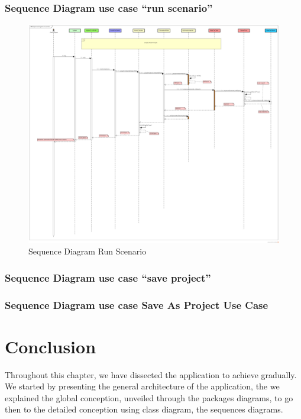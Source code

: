 	\subsubsection{Sequence Diagram use case ``run scenario''}
	\begin{figure}[h]
		\centering
		\includegraphics[width=1\textwidth]{SequenceDiagramRunScenario.png}
		\caption{Sequence Diagram Run Scenario}
	\end{figure}
	\clearpage
    \newpage 
	\subsubsection{Sequence Diagram use case ``save project''}	
	
	
    \pagebreak

	\clearpage
	\newpage
	\subsubsection{Sequence Diagram use case Save As Project Use Case}


    \pagebreak
	\clearpage
	\newpage
	\section{Conclusion}
	Throughout this chapter, we have dissected the application to achieve gradually.
	We started by presenting the general architecture of the application, the we explained the global conception, unveiled through the packages diagrams, to go then to the detailed conception using class diagram, the sequences diagrams.  
	
